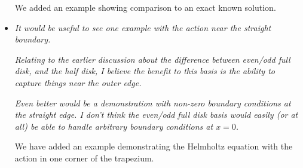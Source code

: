 \documentclass[10pt]{letter}
\newcommand{\comment}[1]{\textit{\color{bluey}#1}}
\begin{document}
\begin{itemize}[parsep=1em,leftmargin=1em]
We added an example showing comparison to an exact known solution.


\item \comment{It would be useful to see one example with the action near the straight boundary. }

\comment{Relating to the earlier discussion about the difference between even/odd full disk, and the half disk, I believe the benefit to this basis is the ability to capture things near the outer edge. }

\comment{Even better would be a demonstration with non-zero boundary conditions at the straight edge. I don't think the even/odd full disk basis would easily (or at all) be able to handle arbitrary boundary conditions at $x=0$.}

We have added an example demonstrating the Helmholtz equation with the action in one corner of the trapezium.


\end{itemize}
\end{document}
